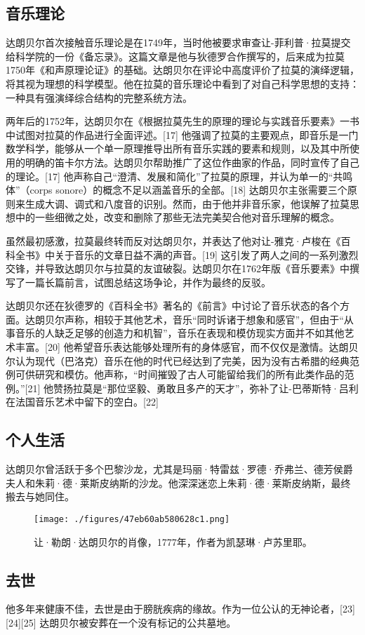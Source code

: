 \subsection{音乐理论}
达朗贝尔首次接触音乐理论是在1749年，当时他被要求审查让-菲利普·拉莫提交给科学院的一份《备忘录》。这篇文章是他与狄德罗合作撰写的，后来成为拉莫1750年《和声原理论证》的基础。达朗贝尔在评论中高度评价了拉莫的演绎逻辑，将其视为理想的科学模型。他在拉莫的音乐理论中看到了对自己科学思想的支持：一种具有强演绎综合结构的完整系统方法。

两年后的1752年，达朗贝尔在《根据拉莫先生的原理的理论与实践音乐要素》一书中试图对拉莫的作品进行全面评述。[17] 他强调了拉莫的主要观点，即音乐是一门数学科学，能够从一个单一原理推导出所有音乐实践的要素和规则，以及其中所使用的明确的笛卡尔方法。达朗贝尔帮助推广了这位作曲家的作品，同时宣传了自己的理论。[17] 他声称自己“澄清、发展和简化”了拉莫的原理，并认为单一的“共鸣体”（corps sonore）的概念不足以涵盖音乐的全部。[18] 达朗贝尔主张需要三个原则来生成大调、调式和八度音的识别。然而，由于他并非音乐家，他误解了拉莫思想中的一些细微之处，改变和删除了那些无法完美契合他对音乐理解的概念。

虽然最初感激，拉莫最终转而反对达朗贝尔，并表达了他对让-雅克·卢梭在《百科全书》中关于音乐的文章日益不满的声音。[19] 这引发了两人之间的一系列激烈交锋，并导致达朗贝尔与拉莫的友谊破裂。达朗贝尔在1762年版《音乐要素》中撰写了一篇长篇前言，试图总结这场争论，并作为最终的反驳。

达朗贝尔还在狄德罗的《百科全书》著名的《前言》中讨论了音乐状态的各个方面。达朗贝尔声称，相较于其他艺术，音乐“同时诉诸于想象和感官”，但由于“从事音乐的人缺乏足够的创造力和机智”，音乐在表现和模仿现实方面并不如其他艺术丰富。[20] 他希望音乐表达能够处理所有的身体感官，而不仅仅是激情。达朗贝尔认为现代（巴洛克）音乐在他的时代已经达到了完美，因为没有古希腊的经典范例可供研究和模仿。他声称，“时间摧毁了古人可能留给我们的所有此类作品的范例。”[21] 他赞扬拉莫是“那位坚毅、勇敢且多产的天才”，弥补了让-巴蒂斯特·吕利在法国音乐艺术中留下的空白。[22]
\subsection{个人生活}
达朗贝尔曾活跃于多个巴黎沙龙，尤其是玛丽·特雷兹·罗德·乔弗兰、德芳侯爵夫人和朱莉·德·莱斯皮纳斯的沙龙。他深深迷恋上朱莉·德·莱斯皮纳斯，最终搬去与她同住。
\begin{figure}[ht]
\centering
\texttt{[image: ./figures/47eb60ab580628c1.png]}
\caption{让·勒朗·达朗贝尔的肖像，1777年，作者为凯瑟琳·卢苏里耶。} \label{fig_BR_4}
\end{figure}
\subsection{去世}
他多年来健康不佳，去世是由于膀胱疾病的缘故。作为一位公认的无神论者，[23][24][25] 达朗贝尔被安葬在一个没有标记的公共墓地。